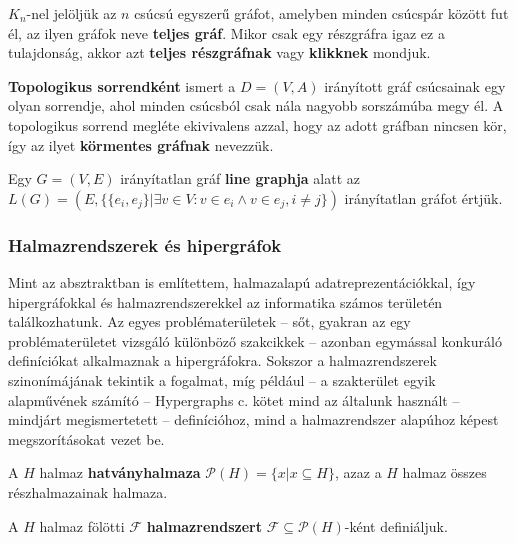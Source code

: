 \begin{definition}
$K_n$-nel jelöljük az $n$ csúcsú egyszerű gráfot, amelyben minden csúcspár között fut él, az ilyen gráfok neve \textbf{teljes gráf}. Mikor csak egy részgráfra igaz ez a tulajdonság, akkor azt \textbf{teljes részgráfnak} vagy \textbf{klikknek} mondjuk.
\end{definition}


\begin{definition}
\textbf{Topologikus sorrendként} ismert a $D=(V,A)$ irányított gráf csúcsainak egy olyan sorrendje, ahol minden csúcsból csak nála nagyobb sorszámúba megy él. A topologikus sorrend megléte ekivivalens azzal, hogy az adott gráfban nincsen kör, így az ilyet \textbf{körmentes gráfnak} nevezzük.
\end{definition}

\begin{definition}
Egy $G=(V,E)$ irányítatlan gráf \textbf{line graphja} alatt az $L(G)=(E, \{ \{ e_i, e_j \} | \exists v \in V : v \in e_i \land v \in e_j, i \neq j \})$ irányítatlan gráfot értjük.
\end{definition}

\subsubsection{Halmazrendszerek és hipergráfok}

Mint az absztraktban is említettem, halmazalapú adatreprezentációkkal, így hipergráfokkal és halmazrendszerekkel az informatika számos területén találkozhatunk. Az egyes problématerületek -- sőt, gyakran az egy problématerületet vizsgáló különböző szakcikkek -- azonban egymással konkuráló definíciókat alkalmaznak a hipergráfokra. Sokszor a halmazrendszerek szinonímájának tekintik a fogalmat, míg például -- a szakterület egyik alapművének számító -- Hypergraphs c. \cite{berge_hypergraphs_book} kötet mind az általunk használt -- mindjárt megismertetett -- definícióhoz, mind a halmazrendszer alapúhoz képest megszorításokat vezet be.

\begin{definition}
A $H$ halmaz \textbf{hatványhalmaza} $\mathcal{P}(H) = \{x | x \subseteq H\}$, azaz a $H$ halmaz összes részhalmazainak halmaza.
\end{definition}

\begin{definition}
A $H$ halmaz fölötti $\mathcal{F}$ \textbf{halmazrendszert} $\mathcal{F} \subseteq \mathcal{P}(H)$-ként definiáljuk.
\end{definition}


